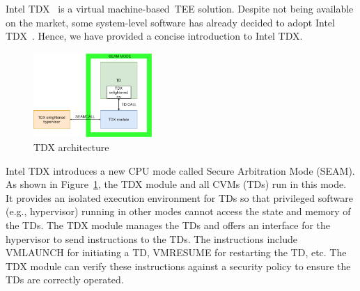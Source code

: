 Intel TDX~\cite*{Intel_tdx_whitepaper} is a virtual machine-based~\acrshort{TEE} solution. Despite not being available on the market, some system-level software has already decided to adopt Intel TDX~\cite*{Kate_support_tdx, Linux_support_tdx}. Hence, we have provided a concise introduction to Intel TDX.
\begin{figure}[htp]
  \centering
  \includegraphics[width=0.4\textwidth]{images/td_arch.png}
  \caption[TDX architecture]{TDX architecture}
  \label{fig:td_arch}
\end{figure}
Intel TDX introduces a new CPU mode called Secure Arbitration Mode (SEAM). As shown in Figure~\ref{fig:td_arch}, the TDX module and all \acrshort{CVM}s (TDs) run in this mode. It provides an isolated execution environment for TDs so that privileged software (e.g., hypervisor) running in other modes cannot access 
the state and memory of the TDs. The TDX module manages the TDs and offers an interface for the hypervisor to send instructions to the TDs. The instructions include VMLAUNCH for initiating a TD, VMRESUME for restarting the TD, etc. The TDX module can verify these instructions against a security 
policy to ensure the TDs are correctly operated.
